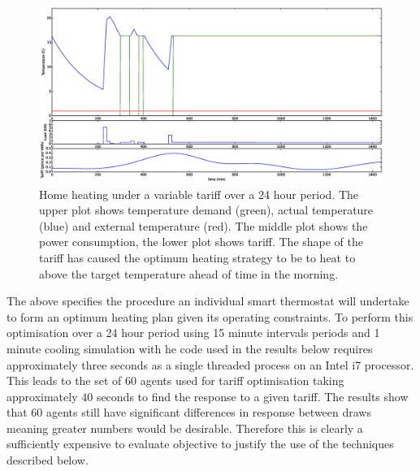 \documentclass[a4paper, 10 pt, conference]{ieeeconf}  %
\begin{document}
\begin{figure}[htb]

\centering
\includegraphics[width=\textwidth,trim =4cm 8cm 4cm 2cm,clip=True]{f4.eps}
\caption{Home heating under a variable tariff over a 24 hour period. The upper plot shows temperature demand (green), actual temperature (blue) and external temperature (red). The middle plot shows the power consumption, the lower plot shows tariff. The shape of the tariff has caused the optimum  heating strategy to be to heat to above the target temperature ahead of time in the morning.}
\label{quadtemp}
\end{figure}

The above specifies the procedure an individual smart thermostat will undertake to form an optimum heating plan given its operating constraints. To perform this optimisation over a 24 hour period using 15 minute intervals periods and 1 minute cooling simulation with he code used in the results below requires approximately three seconds as a single threaded process on an Intel i7 processor. This leads to the set of 60 agents used for tariff optimisation taking approximately 40 seconds to find the response to a given tariff. The results show that 60 agents still have significant differences in response between draws meaning greater numbers would be desirable. Therefore this is clearly a sufficiently expensive to evaluate objective to justify the use of the techniques described below. 
\end{document}

